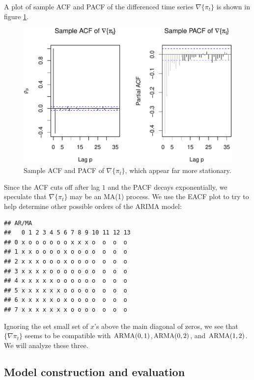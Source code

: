 \documentclass[final,
  11pt,
]{article}
\begin{document}
A plot of sample ACF and PACF of the differenced time series $\nabla \{\pi_t\}$
is shown in figure \ref{fig:f3}.

\begin{figure}
\includegraphics{paper_files/figure-latex/unnamed-chunk-6-1.pdf}
\caption{Sample ACF and PACF of $\nabla \{\pi_t\}$, which appear far more stationary.}
\label{fig:f3}
\end{figure}


Since the ACF cuts off after lag \(1\) and the PACF decays
exponentially, we speculate that \(\nabla\{\pi_t\}\) may be an MA(1)
process. We use the EACF plot to try to help determine other possible
orders of the ARIMA model:

\begin{verbatim}
## AR/MA
##   0 1 2 3 4 5 6 7 8 9 10 11 12 13
## 0 x o o o o o o x x x o  o  o  o 
## 1 x x o o o o x o o o o  o  o  o 
## 2 x x x o o o x o o o o  o  o  o 
## 3 x x x x o o o o o o o  o  o  o 
## 4 x x x x x o o o o o o  o  o  o 
## 5 x x x x x x o o o o o  o  o  o 
## 6 x x x x x o x o o o o  o  o  o 
## 7 x x x x x x x o o o o  o  o  o
\end{verbatim}

Ignoring the set small set of \(x\)'s above the main diagonal of zeros,
we see that \(\{\nabla \pi_t\}\) seems to be compatible with
\(\operatorname{ARMA}(0,1)\),\(\operatorname{ARMA}(0,2)\), and \(\operatorname{ARMA}(1,2)\). We will analyze these
three.

\hypertarget{model-construction-and-evaluation}{%
\subsection{Model construction and
evaluation}\label{model-construction-and-evaluation}}
\end{document}
